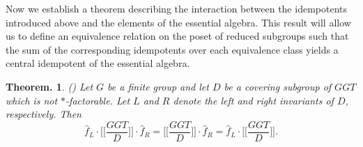 \documentclass[12pt]{article}
\theoremstyle{change}
\newtheorem{theorem}{Theorem.}[section]
\newcommand{\1}{{\bf 1}}
\begin{document}
Now we establish a theorem describing the interaction between the idempotents introduced above and the elements of the essential algebra. This result will allow us to define an equivalence relation on the poset of reduced subgroups such that the sum of the corresponding idempotents over each equivalence class yields a central idempotent of the essential algebra.

\begin{theorem}({\cite[Lemma 4.5]{BC}})
\label{thm: leftrightinvariants}
Let $G$ be a finite group and let $D$ be a covering subgroup of $GGT$ which is not $\ast$-factorable. Let $L$ and $R$ denote the left and right invariants of $D$, respectively. Then
\[
\widehat{f}_L\cdot \Big[\Big[\frac{GGT}{D}\Big]\Big] \cdot \widehat{f}_R
= \Big[\Big[\frac{GGT}{D}\Big]\Big] \cdot \widehat{f}_R
= \widehat{f}_L\cdot \Big[\Big[\frac{GGT}{D}\Big]\Big].
\]
\end{theorem}
\end{document}

